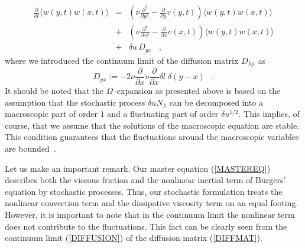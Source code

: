 \begin{eqnarray}
\frac{\partial}{\partial t} \langle w(y,t)w(x,t) \rangle & = &
 \left( \nu \frac{\partial^2}{\partial y^2}
       - \frac{\partial}{\partial y} v(y,t) \right) \langle w(y,t)w(x,t) \rangle
       \nonumber \\
& + & \left( \nu \frac{\partial^2}{\partial x^2}
       - \frac{\partial}{\partial x} v(x,t) \right) \langle w(y,t)w(x,t) \rangle
       \nonumber \\
& + & \delta u \, D_{yx}     \label{wwcorr} \;\;\; ,
\end{eqnarray}
where we introduced the continuum limit of the diffusion matrix
$D_{\lambda \mu}$ as
\begin{equation}
\label{DIFFUSION}
D_{yx} :=  -2 \nu  \frac{\partial}{\partial x} {\tilde{v}}
         \frac{\partial}{\partial x} 
         \delta l \; \delta(y-x)     \;\;\; .
\end{equation}
It should be noted
that the $\Omega$--expansion as presented above is based on the assumption
that the stochastic process $\delta u N_{\lambda}$ 
can be decomposed into a macroscopic part of order
$1$ and a fluctuating part of order $\delta u^{1/2}$. This implies, of course,
that we assume that the solutions of the macroscopic equation are stable.
This condition guarantees that the fluctuations around the macroscopic
variables are bounded~\cite{KAMPEN}.

Let us make an important remark. Our master equation (\ref{MASTEREQ})
describes both the viscous friction and the nonlinear inertial term
of Burgers' equation by stochastic processes. Thus, our stochastic
formulation treats the nonlinear convection term and the dissipative viscosity
term on an equal footing. How\-ever, it is important to note that in the continuum
limit the nonlinear term does not contribute to the fluctuations.
This fact can be clearly seen from the continuum limit (\ref{DIFFUSION})
of the diffusion matrix (\ref{DIFFMAT}).

